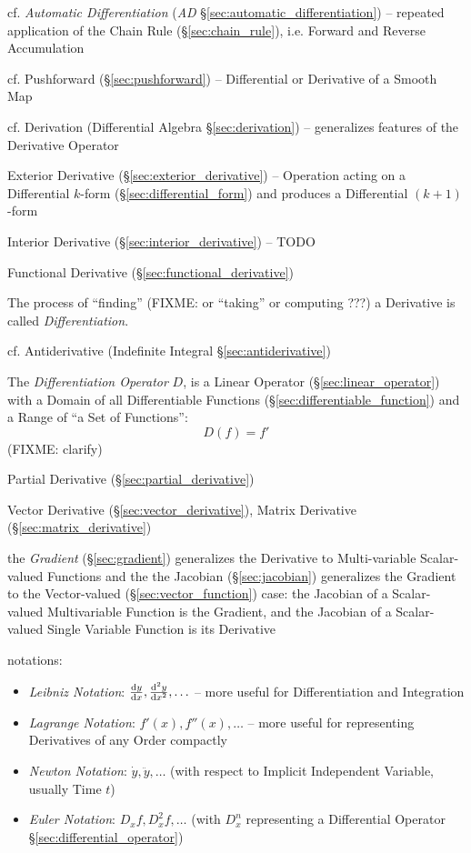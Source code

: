\fist cf. \emph{Automatic Differentiation} (\emph{AD}
\S\ref{sec:automatic_differentiation}) -- repeated application of the Chain Rule
(\S\ref{sec:chain_rule}), i.e. Forward and Reverse Accumulation

\asterism

\fist cf. Pushforward (\S\ref{sec:pushforward}) -- Differential or Derivative of
a Smooth Map

\fist cf. Derivation (Differential Algebra \S\ref{sec:derivation}) --
generalizes features of the Derivative Operator

\fist Exterior Derivative (\S\ref{sec:exterior_derivative}) -- Operation acting
on a Differential $k$-form (\S\ref{sec:differential_form}) and produces a
Differential $(k+1)$-form

\fist Interior Derivative (\S\ref{sec:interior_derivative}) -- TODO

\fist Functional Derivative (\S\ref{sec:functional_derivative})

The process of ``finding'' (FIXME: or ``taking'' or computing ???) a Derivative
is called \emph{Differentiation}.

\fist cf. Antiderivative (Indefinite Integral \S\ref{sec:antiderivative})

The \emph{Differentiation Operator} $D$, is a Linear Operator
(\S\ref{sec:linear_operator}) with a Domain of all Differentiable Functions
(\S\ref{sec:differentiable_function}) and a Range of ``a Set of Functions'':
\[
  D(f) = f'
\]
(FIXME: clarify)

\fist Partial Derivative (\S\ref{sec:partial_derivative})

\fist Vector Derivative (\S\ref{sec:vector_derivative}), Matrix Derivative
(\S\ref{sec:matrix_derivative})

\fist the \emph{Gradient} (\S\ref{sec:gradient}) generalizes the Derivative to
Multi-variable Scalar-valued Functions and the the Jacobian
(\S\ref{sec:jacobian}) generalizes the Gradient to the Vector-valued
(\S\ref{sec:vector_function}) case: the Jacobian of a Scalar-valued
Multivariable Function is the Gradient, and the Jacobian of a Scalar-valued
Single Variable Function is its Derivative

notations:
\begin{itemize}
  \item \emph{Leibniz Notation}: $\frac{\mathrm{d}y}{\mathrm{d}x}, \frac{\mathrm{d}^2{y}}{\mathrm{d}x^2}, \ldots$
    -- more useful for Differentiation and Integration
  \item \emph{Lagrange Notation}: $f'(x), f''(x), \ldots$
    -- more useful for representing Derivatives of any Order compactly
  \item \emph{Newton Notation}: $\dot{y}, \ddot{y}, \ldots$ (with respect to
    Implicit Independent Variable, usually Time $t$)
  \item \emph{Euler Notation}: $D_x{f}, D^2_x{f}, \ldots$ (with $D_x^n$
    representing a Differential Operator \S\ref{sec:differential_operator})
\end{itemize}

